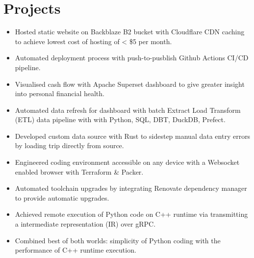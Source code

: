 \section{Projects}
\begin{itemize}
  \item Hosted static website on Backblaze B2 bucket with Cloudflare CDN caching to achieve lowest cost of hosting of < \$5 per month.
  \item Automated deployment process with push-to-pusblish Github Actions CI/CD pipeline.
\end{itemize}

\begin{itemize}
  \item Visualised cash flow with Apache Superset dashboard to give greater insight into personal financial health.
  \item Automated data refresh for dashboard with batch Extract Load Transform (ETL) data pipeline with with Python, SQL, DBT, DuckDB, Prefect.
  \item Developed custom data source with Rust to sidestep manual data entry errors by loading trip directly from source.
\end{itemize}
\begin{itemize}
  \item Engineered coding environment accessible on any device with a Websocket enabled browser with Terraform \& Packer.
  \item Automated toolchain upgrades by integrating Renovate dependency manager to provide automatic upgrades.
\end{itemize}
\begin{itemize}
  \item Achieved remote execution of Python code on C++ runtime via transmitting a intermediate representation (IR) over gRPC.
  \item Combined best of both worlds: simplicity of Python coding with the performance of C++ runtime execution.
\end{itemize}

